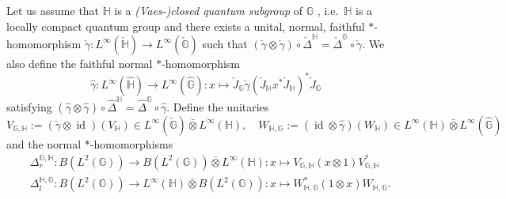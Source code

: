 \documentclass[reqno]{amsart}
\numberwithin{equation}{section}
\DeclareMathOperator{\id}{\mathrm{id}}
\newcommand{\G}{\mathbb{G}}
\newcommand{\ovot}{\bar{\otimes}}
\begin{document}
Let us assume that $\mathbb{H}$ is a \emph{(Vaes-)closed quantum subgroup} of $\G$ \cite{DKSS12}, i.e.\ $\mathbb{H}$ is a locally compact quantum group and there exists a unital, normal, faithful $*$-homomorphism $\check{\gamma}: L^\infty(\check{\mathbb{H}})\to L^\infty(\check{\G})$ such that $(\check{\gamma}\otimes \check{\gamma})\circ \check{\Delta}^{\mathbb{H}}= \check{\Delta}^{\mathbb{G}}\circ \check{\gamma}.$ We also define the faithful normal $*$-homomorphism
$$\hat{\gamma}: L^\infty(\hat{\mathbb{H}})\to L^\infty(\hat{\G}): x \mapsto \check{J}_\G\check{\gamma}(\check{J}_{\mathbb{H}}x^* \check{J}_{\mathbb{H}})^*\check{J}_\G$$
satisfying $(\hat{\gamma}\otimes \hat{\gamma})\circ \hat{\Delta}^{\mathbb{H}} = \hat{\Delta}^\G \circ \hat{\gamma}.$ Define the unitaries
$$V_{\G, \mathbb{H}}:= (\check{\gamma} \otimes \id)(V_\mathbb{H})\in L^\infty(\check{\G})\bar{\otimes} L^\infty(\mathbb{H}), \quad W_{\mathbb{H}, \G}:=(\id \otimes \hat{\gamma})(W_{\mathbb{H}}) \in L^\infty(\mathbb{H})\ovot L^\infty(\hat{\G})$$
and the normal $*$-homomorphisms
\begin{align*}
    &\Delta_r^{\G, \mathbb{H}}: B(L^2(\G))\to B(L^2(\G))\bar{\otimes}L^\infty(\mathbb{H}): x \mapsto V_{\G, \mathbb{H}}(x\otimes 1)V_{\G, \mathbb{H}}^*\\
    &\Delta_l^{\mathbb{H}, \G}: B(L^2(\G))\to L^\infty(\mathbb{H})\ovot B(L^2(\G)): x \mapsto W_{\mathbb{H}, \G}^*(1\otimes x)W_{\mathbb{H}, \G}.
\end{align*}
\end{document}
